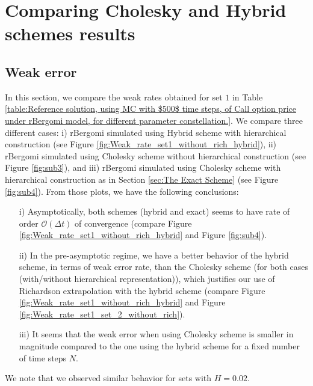 \documentclass[11pt]{article}
\newcommand{\Ordo}[1]{{\mathcal{O}}\left(#1\right)}
\begin{document}



\section{Comparing Cholesky and Hybrid schemes results }

\subsection{Weak error}
In this section, we compare the weak rates obtained for set $1$ in Table
\ref{table:Reference solution, using MC with $500$ time steps, of Call option price under rBergomi model, for different parameter constellation.}. We compare three different cases: i) rBergomi simulated using Hybrid scheme with hierarchical construction (see Figure \ref{fig:Weak_rate_set1_without_rich_hybrid}), ii) rBergomi simulated using Cholesky scheme without hierarchical construction (see Figure \ref{fig:sub3}), and iii) rBergomi simulated using Cholesky scheme with hierarchical construction as in Section \ref{sec:The Exact Scheme} (see Figure \ref{fig:sub4}). From those plots, we have the following conclusions:
\begin{itemize}
\item[i)] Asymptotically, both schemes (hybrid and exact) seems to have rate  of order $\Ordo{\Delta t}$ of convergence (compare Figure \ref{fig:Weak_rate_set1_without_rich_hybrid} and Figure \ref{fig:sub4}).
\item[ii)]  In the pre-asymptotic regime, we have a better behavior of the hybrid scheme, in terms of weak error rate, than the Cholesky scheme (for both cases (with/without hierarchical representation)), which justifies our use of Richardson extrapolation with the hybrid scheme (compare Figure \ref{fig:Weak_rate_set1_without_rich_hybrid} and Figure \ref{fig:Weak_rate_set1_set_2_without_rich}).
\item[iii)] It seems that the weak error when using Cholesky scheme is smaller in magnitude compared to the one using the hybrid scheme for a fixed number of time steps $N$.
\end{itemize}  
We note that we observed similar behavior for sets with $H=0.02$.
\end{document}
